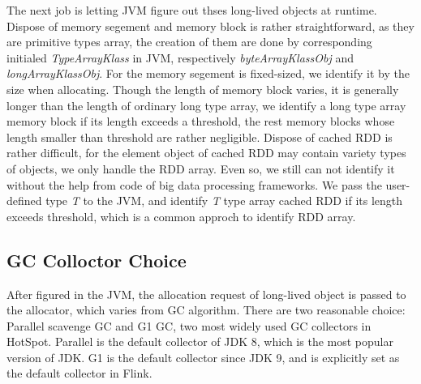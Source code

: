 \documentclass[sigplan, screen]{acmart}
\begin{document}
The next job is letting JVM figure out thses long-lived objects at runtime. Dispose of memory segement and memory block is rather straightforward, as they are primitive types array, 
the creation of them are done by corresponding initialed \emph{TypeArrayKlass} in JVM, respectively \emph{byteArrayKlassObj} and \emph{longArrayKlassObj}. For the memory segement 
is fixed-sized, we identify it by the size when allocating. Though the length of memory block varies, it is generally longer than the length of ordinary long type array, we identify a long type array memory
block if its length exceeds a threshold, the rest memory blocks whose length smaller than threshold are rather negligible. Dispose of cached RDD is rather difficult, for the element object of cached RDD may contain 
variety types of objects, we only handle the RDD array. Even so, we still can not identify it without the help from code of big data processing frameworks. We pass the user-defined type \emph{T}
 to the JVM, and identify \emph{T} type array cached RDD if its length exceeds threshold, which is a common approch to identify RDD array\cite{wang2019panthera}.         

\subsection{GC Colloctor Choice}
After figured in the JVM, the allocation request of long-lived object is passed to the allocator, which varies from GC algorithm. There are two reasonable choice: 
Parallel scavenge GC and G1 GC, two most widely used GC collectors in HotSpot. Parallel is the default collector of JDK 8, which is the most popular version of JDK. 
G1 is the default collector since JDK 9, and is explicitly set as the default collector in Flink.
\end{document}
